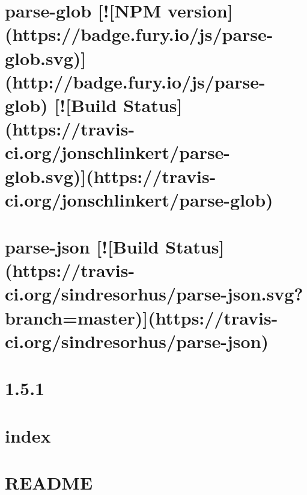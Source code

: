 \documentclass[twoside]{book}
\newcommand{\+}{\discretionary{\mbox{\scriptsize$\hookleftarrow$}}{}{}}
\begin{document}
\chapter{parse-\/glob \mbox{[}!\mbox{[}N\+PM version\mbox{]}(https\+://badge.fury.\+io/js/parse-\/glob.svg)\mbox{]}(http\+://badge.fury.\+io/js/parse-\/glob) \mbox{[}!\mbox{[}Build Status\mbox{]}(https\+://travis-\/ci.org/jonschlinkert/parse-\/glob.svg)\mbox{]}(https\+://travis-\/ci.org/jonschlinkert/parse-\/glob)}
\label{md__c_1_workspace_demo_src_main_script_node_modules_parse-glob__r_e_a_d_m_e}

\chapter{parse-\/json \mbox{[}!\mbox{[}Build Status\mbox{]}(https\+://travis-\/ci.org/sindresorhus/parse-\/json.svg?branch=master)\mbox{]}(https\+://travis-\/ci.org/sindresorhus/parse-\/json)}
\label{md__c_1_workspace_demo_src_main_script_node_modules_parse-json_readme}

\chapter{1.5.1}
\label{md__c_1_workspace_demo_src_main_script_node_modules_parse5__c_h_a_n_g_e_l_o_g}

\chapter{index}
\label{md__c_1_workspace_demo_src_main_script_node_modules_parse5_docs_build_index}

\chapter{R\+E\+A\+D\+ME}
\label{md__c_1_workspace_demo_src_main_script_node_modules_parse5__r_e_a_d_m_e}

\end{document}
